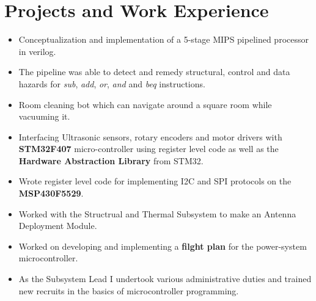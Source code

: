 \documentclass{resume}
\begin{document}
\section{Projects and Work Experience}
    \begin{itemize}\setlength{\itemsep}{0pt}\setlength{\parskip}{0pt}\vspace{-0.5em}
        \item Conceptualization and implementation of a 5-stage MIPS pipelined processor in verilog.
        \item The pipeline was able to detect and remedy structural, control and data hazards for \emph{sub}, \emph{add}, \emph{or}, \emph{and} and \emph{beq} instructions.
    \end{itemize}
\begin{itemize}\setlength{\itemsep}{0pt}\setlength{\parskip}{0pt}\vspace{-0.5em}
    \item Room cleaning bot which can navigate around a square room while vacuuming it.
    \item Interfacing Ultrasonic sensors, rotary encoders and motor drivers with \textbf{STM32F407} micro-controller using register level code as well as the \textbf{Hardware Abstraction Library} from STM32.
\end{itemize}
\begin{itemize}\setlength{\itemsep}{0pt}\setlength{\parskip}{0pt}\vspace{-0.5em}
    \item Wrote register level code for implementing I2C and SPI protocols on the \textbf{MSP430F5529}.
    \item Worked with the Structrual and Thermal Subsystem to make an Antenna Deployment Module.
    \item Worked on developing and implementing a \textbf{filght plan} for the power-system microcontroller.
    \item As the Subsystem Lead I undertook various administrative duties and trained new recruits in the basics of microcontroller programming.
\end{itemize}
\end{document}
